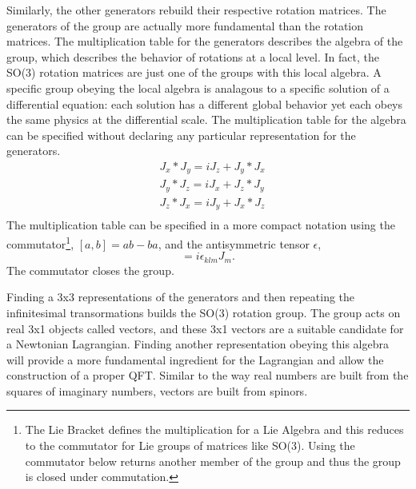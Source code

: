 \documentclass[12pt]{article}
\begin{document}
Similarly, the other generators rebuild their respective rotation matrices. The generators of the group are actually more fundamental than the rotation matrices. The multiplication table for the generators describes the algebra of the group, which describes the behavior of rotations at a local level. In fact, the SO(3) rotation matrices are just one of the groups with this local algebra. A specific group obeying the local algebra is analagous to a specific solution of a differential equation: each solution has a different global behavior yet each obeys the same physics at the differential scale. The multiplication table for the algebra can be specified without declaring any particular representation for the generators. 
\begin{equation}
\begin{split}
&J_x*J_y = iJ_z  + J_y*J_x \\
&J_y*J_z = iJ_x  + J_z*J_y \\
&J_z*J_x = iJ_y  + J_x*J_z \\
\end{split}
\end{equation}
The multiplication table can be specified in a more compact notation using the commutator\footnote{The Lie Bracket defines the multiplication for a Lie Algebra and this reduces to the commutator for Lie groups of matrices like SO(3). Using the commutator below returns another member of the group and thus the group is closed under commutation.}, $[a,b] = ab - ba$, and the antisymmetric tensor $\epsilon$,
\begin{equation}
[J_k, J_l] = i\epsilon_{klm}J_m.
\end{equation}
The commutator closes the group.

Finding a 3x3 representations of the generators and then repeating the infinitesimal transormations builds the SO(3) rotation group. The group acts on real 3x1 objects called vectors, and these 3x1 vectors are a suitable candidate for a Newtonian Lagrangian. Finding another representation obeying this algebra will provide a more fundamental ingredient for the Lagrangian and allow the construction of a proper QFT. Similar to the way real numbers are built from the squares of imaginary numbers, vectors are built from spinors. 
\end{document}
